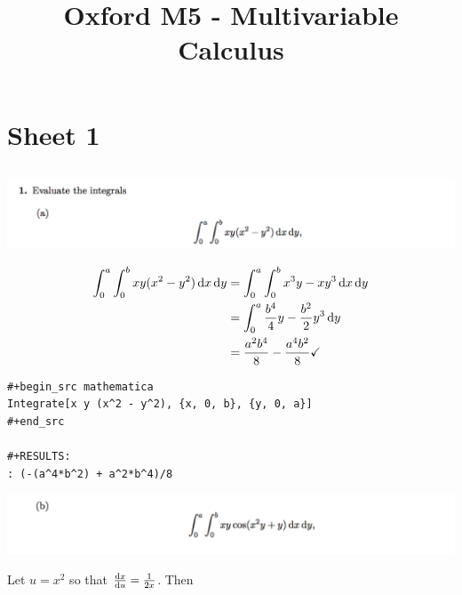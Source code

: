 \documentclass[12pt]{article}
\begin{document}
\title{Oxford M5 - Multivariable Calculus
  }
\author{}
\date{}
\maketitle


\section{Sheet 1}

\subsection{}
\begin{mdframed}
\includegraphics[width=400pt]{img/oxford-prelims-M5-multivariable-calc-1-1-a.png}
\end{mdframed}

\begin{align*}
  \int_0^a\int_0^b xy(x^2 - y^2)\dx\dy
  &= \int_0^a\int_0^b x^3y - xy^3\dx\dy\\
  &= \int_0^a\frac{b^4}{4}y - \frac{b^2}{2}y^3\dy\\
  &= \frac{a^2b^4}{8} - \frac{a^4b^2}{8} \checkmark
\end{align*}

\begin{verbatim}
#+begin_src mathematica
Integrate[x y (x^2 - y^2), {x, 0, b}, {y, 0, a}]
#+end_src

#+RESULTS:
: (-(a^4*b^2) + a^2*b^4)/8

\end{verbatim}


\newpage
\begin{mdframed}
\includegraphics[width=400pt]{img/oxford-prelims-M5-multivariable-calc-1-1-b.png}
\end{mdframed}

Let $u = x^2$ so that $\dxdu = \frac{1}{2x}$. Then
\end{document}
